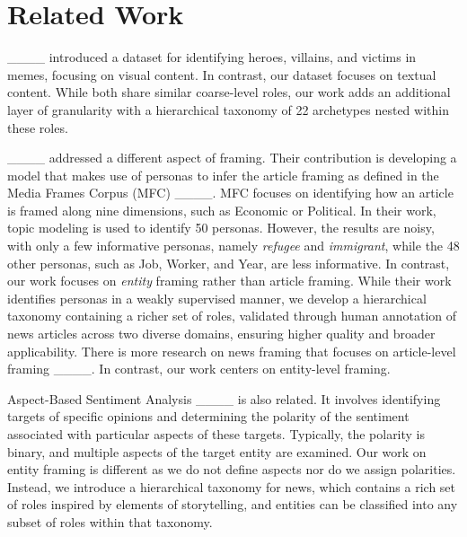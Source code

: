 \section{Related Work\label{sec:related_work}
}

____ introduced a dataset for identifying heroes, villains, and victims in memes, focusing on visual content. In contrast, our dataset focuses on textual content. While both share similar coarse-level roles, our work adds an additional layer of granularity with a hierarchical taxonomy of 22 archetypes nested within these roles. 

____ addressed a different aspect of framing. Their contribution is developing a model that makes use of personas to infer the article framing as defined in the Media Frames Corpus (MFC)  ____. MFC focuses on identifying how an article is framed along nine dimensions, such as Economic or Political. In their work, topic modeling is used to identify 50 personas. However, the results are noisy, with only a few informative personas, namely \emph{refugee} and \emph{immigrant}, while the 48 other personas, such as Job, Worker, and Year, are less informative. In contrast, our work focuses on \emph{entity} framing rather than article framing. While their work identifies personas in a weakly supervised manner, we develop a hierarchical taxonomy containing a richer set of roles, validated through human annotation of news articles across two diverse domains, ensuring higher quality and broader applicability. There is more research on news framing that focuses on article-level framing ____. In contrast, our work centers on entity-level framing.

Aspect-Based Sentiment Analysis ____ is also related. It involves identifying targets of specific opinions and determining the polarity of the sentiment associated with particular aspects of these targets. Typically, the polarity is binary, and multiple aspects of the target entity are examined. Our work on entity framing is different as we do not define aspects nor do we assign polarities. Instead, we introduce a hierarchical taxonomy for news, which contains a rich set of roles inspired by elements of storytelling, and entities can be classified into any subset of roles within that taxonomy.